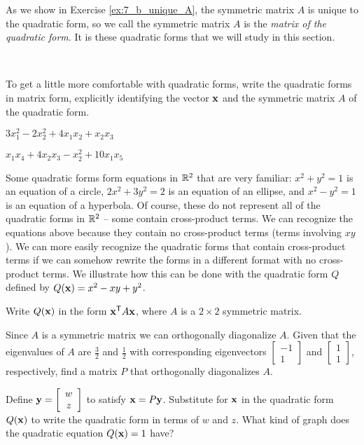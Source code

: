As we show in Exercise \ref{ex:7_b_unique_A}, the symmetric matrix $A$ is unique to the quadratic form, so we call the symmetric matrix $A$ is the \emph{matrix of the quadratic form}. It is these quadratic forms that we will study in this section.

\begin{pa} \label{pa:7_b}  ~
\be
\item To get a little more comfortable with quadratic forms, write the quadratic forms in matrix form, explicitly identifying the vector $\mathbf{x}$ and the symmetric matrix $A$ of the quadratic form.
	\ba
	\item $3x_1^2-2x_2^2 +4x_1x_2+x_2x_3$ 

	\item  $x_1x_4 + 4x_2x_3 - x_2^2 + 10x_1x_5$ 

	\ea

\item Some quadratic forms form equations in $\mathbb{R}^2$ that are very familiar: $x^2+y^2=1$ is an equation of a circle, $2x^2+3y^2=2$ is an equation of an ellipse, and $x^2-y^2=1$ is an equation of a hyperbola. Of course, these do not represent all of the quadratic forms in $\mathbb{R}^2$ -- some contain cross-product terms. We can recognize the equations above because they contain no cross-product terms (terms involving $xy$). We can more easily recognize the quadratic forms that contain cross-product terms if  we can somehow rewrite the forms in a different format with no cross-product terms. We illustrate how this can be done with the quadratic form $Q$ defined by $Q(\mathbf{x}) = x^2-xy+y^2$. 
    \ba
    \item Write $Q(\mathbf{x})$ in the form $\mathbf{x}^{\mathsf{T}} A \mathbf{x}$, where $A$ is a $2 \times 2 $ symmetric matrix.

    \item Since $A$ is a symmetric matrix we can orthogonally diagonalize $A$. Given that the eigenvalues of $A$ are $\frac{3}{2}$ and $\frac{1}{2}$ with corresponding eigenvectors $\left[ \begin{array}{r} -1 \\ 1 \end{array} \right]$ and $\left[ \begin{array}{c} 1 \\ 1 \end{array} \right]$, respectively, find a matrix $P$ that orthogonally diagonalizes $A$.

    \item Define $\mathbf{y} = \left[ \begin{array}{c} w \\ z \end{array} \right]$ to satisfy $\mathbf{x} = P\mathbf{y}$. Substitute for $\mathbf{x}$ in the quadratic form $Q(\mathbf{x})$ to write the quadratic form in terms of $w$ and $z$. What kind of graph does the quadratic equation $Q(\mathbf{x}) = 1$ have?

    \ea
	

\ee

\end{pa} 



